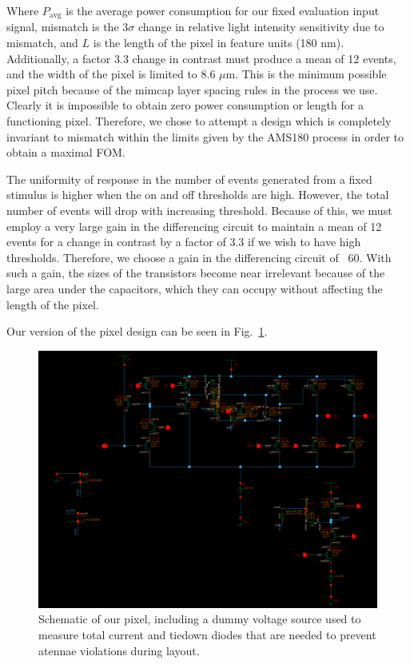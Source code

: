 Where \(P_{\text{avg}}\) is the average power consumption for our fixed evaluation input signal, mismatch is the 
\(3\sigma\) change in relative light intensity sensitivity due to mismatch, and \(L\) is the length of the pixel in feature units (180 nm).
Additionally, a factor 3.3 change in contrast must produce a mean of 12 events, and the width of the pixel is
limited to 8.6 \(\mu\)m. This is the minimum possible pixel pitch because of the mimcap layer spacing rules in the 
process we use.
Clearly it is impossible to obtain zero power consumption or length for a functioning pixel.
Therefore, we chose to attempt a design which is completely invariant to mismatch within the limits given by
the AMS180 process in order to obtain a maximal FOM. 

The uniformity of response in the number of events generated from a fixed stimulus is higher when the on and off
thresholds are high. However, the total number of events will drop with increasing threshold. 
Because of this, we must employ a very large gain in the differencing circuit to maintain a mean of 12 events
for a change in contrast by a factor of 3.3 if we wish to have high thresholds.
Therefore, we choose a gain in the differencing circuit of ~60. With such a gain, the sizes of the 
transistors become near irrelevant because of the large area under the capacitors, which they can occupy without
affecting the length of the pixel.

Our version of the pixel design can be seen in Fig.~\ref{fig:pixel-schem}.
\begin{figure}
    \center
    \includegraphics[angle=90,width=\textwidth]{pixel-schem.png}
    \caption{Schematic of our pixel, including a dummy voltage source used to measure total current and tiedown
    diodes that are needed to prevent atennae violations during layout.}
    \label{fig:pixel-schem}
\end{figure}
